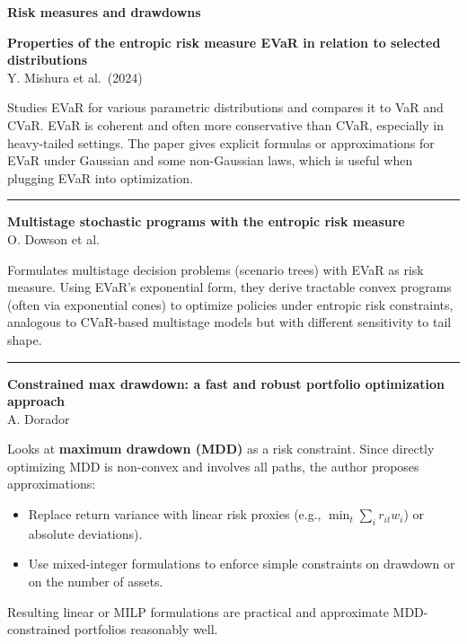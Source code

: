 \documentclass[a5paper]{article}
\providecommand{\tightlist}{%
  \setlength{\itemsep}{0pt}\setlength{\parskip}{0pt}}
\def\subsection#1{{\par\bigskip\goodbreak\large\bfseries #1\par}}
\begin{document}
\subsection{Risk measures and
drawdowns}\label{risk-measures-and-drawdowns}

\textbf{Properties of the entropic risk measure EVaR in relation to
selected distributions}\\
Y. Mishura et al.~(2024)

Studies EVaR for various parametric distributions and compares it to VaR
and CVaR. EVaR is coherent and often more conservative than CVaR,
especially in heavy-tailed settings. The paper gives explicit formulas
or approximations for EVaR under Gaussian and some non-Gaussian laws,
which is useful when plugging EVaR into optimization.

\begin{center}\rule{0.5\linewidth}{0.5pt}\end{center}

\textbf{Multistage stochastic programs with the entropic risk measure}\\
O. Dowson et al.

Formulates multistage decision problems (scenario trees) with EVaR as
risk measure. Using EVaR's exponential form, they derive tractable
convex programs (often via exponential cones) to optimize policies under
entropic risk constraints, analogous to CVaR-based multistage models but
with different sensitivity to tail shape.

\begin{center}\rule{0.5\linewidth}{0.5pt}\end{center}

\textbf{Constrained max drawdown: a fast and robust portfolio
optimization approach}\\
A. Dorador

Looks at \textbf{maximum drawdown (MDD)} as a risk constraint. Since
directly optimizing MDD is non-convex and involves all paths, the author
proposes approximations:

\begin{itemize}
\tightlist
\item
  Replace return variance with linear risk proxies (e.g., $\min_t
  \sum_i r_{it} w_i$) or absolute deviations).
\item
  Use mixed-integer formulations to enforce simple constraints on
  drawdown or on the number of assets.
\end{itemize}

Resulting linear or MILP formulations are practical and approximate
MDD-constrained portfolios reasonably well.
\end{document}
